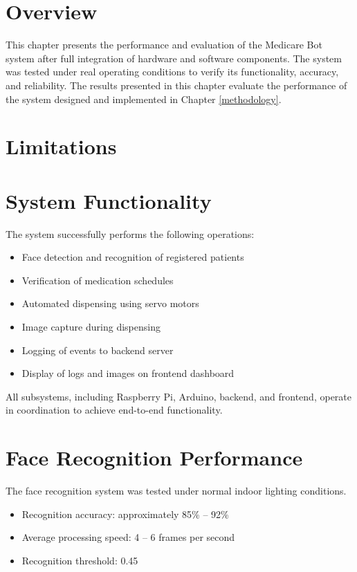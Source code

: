 
\section{Overview}

This chapter presents the performance and evaluation of the Medicare Bot system after full integration of hardware and software components. The system was tested under real operating conditions to verify its functionality, accuracy, and reliability.
The results presented in this chapter evaluate the performance of the system designed and implemented in Chapter \ref{methodology}.

\section{Limitations}


\section{System Functionality}

The system successfully performs the following operations:

\begin{itemize}
    \item Face detection and recognition of registered patients
    \item Verification of medication schedules
    \item Automated dispensing using servo motors
    \item Image capture during dispensing
    \item Logging of events to backend server
    \item Display of logs and images on frontend dashboard
\end{itemize}

All subsystems, including Raspberry Pi, Arduino, backend, and frontend, operate in coordination to achieve end-to-end functionality.

\section{Face Recognition Performance}

The face recognition system was tested under normal indoor lighting conditions.

\begin{itemize}
    \item Recognition accuracy: approximately 85\% -- 92\%
    \item Average processing speed: 4 -- 6 frames per second
    \item Recognition threshold: 0.45
\end{itemize}


